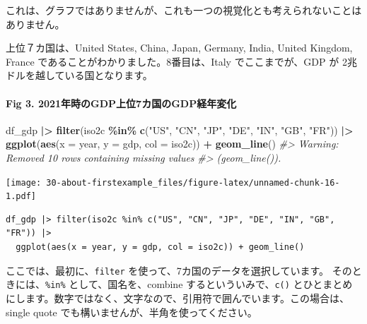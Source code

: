 \documentclass[
  xelatex, ja=standard]{bxjsbook}
\newenvironment{Shaded}{\begin{snugshade}}{\end{snugshade}}
\newcommand{\AttributeTok}[1]{\textcolor[rgb]{0.13,0.29,0.53}{#1}}
\newcommand{\CommentTok}[1]{\textcolor[rgb]{0.56,0.35,0.01}{\textit{#1}}}
\newcommand{\FunctionTok}[1]{\textcolor[rgb]{0.13,0.29,0.53}{\textbf{#1}}}
\newcommand{\NormalTok}[1]{#1}
\newcommand{\SpecialCharTok}[1]{\textcolor[rgb]{0.81,0.36,0.00}{\textbf{#1}}}
\newcommand{\StringTok}[1]{\textcolor[rgb]{0.31,0.60,0.02}{#1}}
\theoremstyle{definition}
\theoremstyle{definition}
\theoremstyle{definition}
\theoremstyle{definition}
\theoremstyle{remark}
\begin{document}
これは、グラフではありませんが、これも一つの視覚化とも考えられないことはありません。

上位７カ国は、United States, China, Japan, Germany, India, United Kingdom, France であることがわかりました。8番目は、Italy でここまでが、GDP が 2兆ドルを越している国となります。

\hypertarget{fig-3.-2021ux5e74ux6642ux306egdpux4e0aux4f4d7ux30abux56fdux306egdpux7d4cux5e74ux5909ux5316}{%
\paragraph{Fig 3. 2021年時のGDP上位7カ国のGDP経年変化}\label{fig-3.-2021ux5e74ux6642ux306egdpux4e0aux4f4d7ux30abux56fdux306egdpux7d4cux5e74ux5909ux5316}}

\begin{Shaded}
\begin{Highlighting}[]
\NormalTok{df\_gdp }\SpecialCharTok{|\textgreater{}} \FunctionTok{filter}\NormalTok{(iso2c }\SpecialCharTok{\%in\%} \FunctionTok{c}\NormalTok{(}\StringTok{"US"}\NormalTok{, }\StringTok{"CN"}\NormalTok{, }\StringTok{"JP"}\NormalTok{, }\StringTok{"DE"}\NormalTok{, }\StringTok{"IN"}\NormalTok{, }\StringTok{"GB"}\NormalTok{, }\StringTok{"FR"}\NormalTok{)) }\SpecialCharTok{|\textgreater{}}
  \FunctionTok{ggplot}\NormalTok{(}\FunctionTok{aes}\NormalTok{(}\AttributeTok{x =}\NormalTok{ year, }\AttributeTok{y =}\NormalTok{ gdp, }\AttributeTok{col =}\NormalTok{ iso2c)) }\SpecialCharTok{+} \FunctionTok{geom\_line}\NormalTok{()}
\CommentTok{\#\textgreater{} Warning: Removed 10 rows containing missing values}
\CommentTok{\#\textgreater{} (\textasciigrave{}geom\_line()\textasciigrave{}).}
\end{Highlighting}
\end{Shaded}

\texttt{[image: 30-about-firstexample\_files/figure-latex/unnamed-chunk-16-1.pdf]}

\begin{verbatim}
df_gdp |> filter(iso2c %in% c("US", "CN", "JP", "DE", "IN", "GB", "FR")) |>
  ggplot(aes(x = year, y = gdp, col = iso2c)) + geom_line()
\end{verbatim}

ここでは、最初に、\texttt{filter} を使って、7カ国のデータを選択しています。 そのときには、\texttt{\%in\%} として、国名を、combine するといういみで、\texttt{c()} とひとまとめにします。数字ではなく、文字なので、引用符で囲んでいます。この場合は、single quote でも構いませんが、半角を使ってください。
\end{document}
